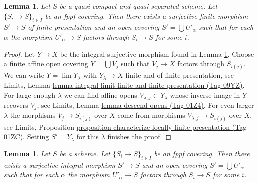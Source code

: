 \documentclass{amsart}
\theoremstyle{plain}
\newtheorem{lemma}[subsection]{Lemma}
\theoremstyle{definition}
\theoremstyle{remark}
\numberwithin{equation}{subsection}
\def\lim{\mathop{\mathrm{lim}}\nolimits}
\begin{document}
\begin{lemma}
\label{more-morphisms-lemma-dominate-fppf-finite}
Let $S$ be a quasi-compact and quasi-separated scheme.
Let $\{S_i \to S\}_{i \in I}$ be an fppf covering.
Then there exists a surjective finite morphism $S' \to S$
of finite presentation and an
open covering $S' = \bigcup U'_\alpha$ such that for each $\alpha$ the
morphism $U'_\alpha \to S$ factors through $S_i \to S$ for some $i$.
\end{lemma}

\begin{proof}
Let $Y \to X$ be the integral surjective morphism found in
Lemma \ref{more-morphisms-lemma-dominate-fppf-integral}.
Choose a finite affine open covering $Y = \bigcup V_j$
such that $V_j \to X$ factors through $S_{i(j)}$.
We can write $Y = \lim Y_\lambda$ with
$Y_\lambda \to X$ finite and of finite presentation, see
Limits, Lemma \href{https://stacks.math.columbia.edu/tag/09YZ}{lemma integral limit finite and finite presentation (Tag 09YZ)}.
For large enough $\lambda$ we can find affine opens
$V_{\lambda, j} \subset Y_\lambda$
whose inverse image in $Y$ recovers $V_j$, see
Limits, Lemma \href{https://stacks.math.columbia.edu/tag/01Z4}{lemma descend opens (Tag 01Z4)}.
For even larger $\lambda$ the morphisms $V_j \to S_{i(j)}$
over $X$ come from morphisms $V_{\lambda, j} \to S_{i(j)}$ over
$X$, see
Limits, Proposition
\href{https://stacks.math.columbia.edu/tag/01ZC}{proposition characterize locally finite presentation (Tag 01ZC)}.
Setting $S' = Y_\lambda$ for this $\lambda$ finishes the proof.
\end{proof}


\begin{lemma}
\label{more-morphisms-lemma-dominate-fppf-integral}
Let $S$ be a scheme. Let $\{S_i \to S\}_{i \in I}$ be an fppf covering.
Then there exists a surjective integral morphism $S' \to S$ and an
open covering $S' = \bigcup U'_\alpha$ such that for each $\alpha$ the
morphism $U'_\alpha \to S$ factors through $S_i \to S$ for some $i$.
\end{lemma}
\end{document}
